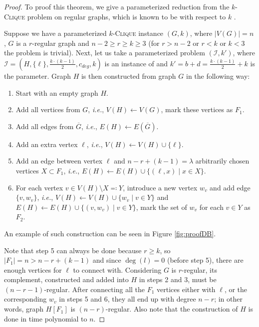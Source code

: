 \begin{proof}\label{proofDB}
    To proof this theorem, we give a parameterized reduction from the $k$-\textsc{Clique} problem on regular graphs,
    which is known to be \Wh with respect to $k$ \cite{Mathieson2008}.
    
    Suppose we have a parameterized $k$-\textsc{Clique} instance $(G, k)$, where
    $|V(G)|=n$, $G$ is a $r$-regular graph and $n-2 \geq r \geq k \geq 3$ (for $r > n-2$ or $r < k$ or $k < 3$ the problem is trivial).
    Next, let us take a parameterized problem $(\mathcal{I}, k')$, where
    $\mathcal{I} = (H, \{\ell\}, \frac{k\cdot(k-1)}{2}, c_{deg}, k)$ is an instance of \HLdeg and
    $k' = b + d = \frac{k\cdot(k-1)}{2} + k$ is the parameter.
    Graph $H$ is then constructed from graph $G$ in the following way:

    \begin{enumerate}
        \item Start with an empty graph $H$.
        \item Add all vertices from $G$, \emph{i.e.}, $V(H) \leftarrow V(G)$, mark these vertices as $F_1$.
        \item Add all edges from $\overline{G}$, \emph{i.e.}, $E(H) \leftarrow E(\overline{G})$.
        \item Add an extra vertex $\ell$, \emph{i.e.}, $V(H) \leftarrow V(H) \cup \{\ell\}$.
        \item Add an edge between vertex $\ell$ and $n - r + (k - 1) = \lambda$ arbitrarily chosen vertices $X \subset F_1$,
        \emph{i.e.}, $E(H) \leftarrow E(H) \cup \{ (\ell, x) \mid x \in X \}$.
        \item For each vertex $v \in V(H) \setminus X \eqqcolon Y$, introduce a new vertex $w_v$ and add edge $\{v, w_v\}$, \emph{i.e.},
              $V(H) \leftarrow V(H) \cup \{ w_v \mid v \in Y \}$ and $E(H) \leftarrow E(H) \cup \{ (v, w_v) \mid v \in Y \}$,
              mark the set of $w_v$ for each $v \in Y$ as $F_2$.
    \end{enumerate}
    An example of such construction can be seen in Figure \ref{fig:proofDB}.

    Note that step 5 can always be done because $r \ge k$, so $|F_1| = n > n - r + (k - 1)$
    and since $\deg(l) = 0$ (before step 5), there are enough vertices for $\ell$ to connect with.
    Considering $G$ is $r$-regular, its complement, constructed and added into $H$ in steps 2 and 3, must be $(n-r-1)$-regular.
    After connecting all the $F_1$ vertices either with $\ell$, or the corresponding $w_v$ in steps 5 and 6,
    they all end up with degree $n-r$; in other words, graph $H[F_1]$ is $(n-r)$-regular.
    Also note that the construction of $H$ is done in time polynomial to $n$.
    

\end{proof}
